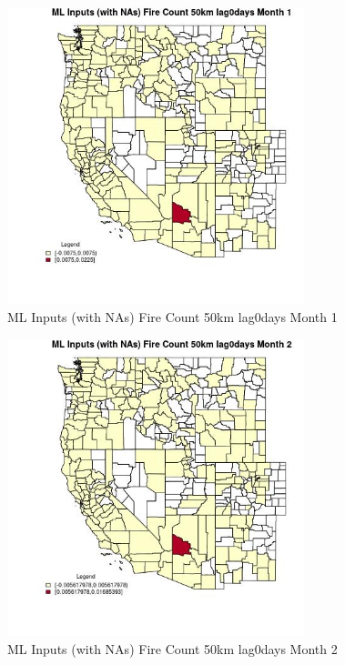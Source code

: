 \begin{figure} 
\centering  
\includegraphics[width=0.77\textwidth]{Code_Outputs/Report_ML_input_PM25_Step4_part_e_de_duplicated_aves_compiled_2019-05-20wNAs_CountyFire_Count_50km_lag0daysmedianMonth1.jpg} 
\caption{\label{fig:Report_ML_input_PM25_Step4_part_e_de_duplicated_aves_compiled_2019-05-20wNAsCountyFire_Count_50km_lag0daysmedianMonth1}ML Inputs (with NAs) Fire Count 50km lag0days Month 1} 
\end{figure} 
 

\begin{figure} 
\centering  
\includegraphics[width=0.77\textwidth]{Code_Outputs/Report_ML_input_PM25_Step4_part_e_de_duplicated_aves_compiled_2019-05-20wNAs_CountyFire_Count_50km_lag0daysmedianMonth2.jpg} 
\caption{\label{fig:Report_ML_input_PM25_Step4_part_e_de_duplicated_aves_compiled_2019-05-20wNAsCountyFire_Count_50km_lag0daysmedianMonth2}ML Inputs (with NAs) Fire Count 50km lag0days Month 2} 
\end{figure} 
 

